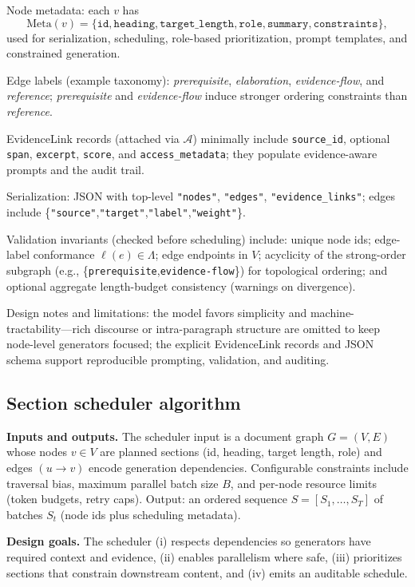 \documentclass{article}%
\begin{document}
Node metadata: each $v$ has
\[
\mathrm{Meta}(v)=\{\texttt{id},\texttt{heading},\texttt{target\_length},\texttt{role},\texttt{summary},\texttt{constraints}\},
\]
used for serialization, scheduling, role-based prioritization, prompt templates, and constrained generation.

Edge labels (example taxonomy): \emph{prerequisite}, \emph{elaboration}, \emph{evidence-flow}, and \emph{reference}; \emph{prerequisite} and \emph{evidence-flow} induce stronger ordering constraints than \emph{reference}.

EvidenceLink records (attached via $\mathcal{A}$) minimally include \texttt{source\_id}, optional \texttt{span}, \texttt{excerpt}, \texttt{score}, and \texttt{access\_metadata}; they populate evidence-aware prompts and the audit trail.

Serialization: JSON with top-level \texttt{"nodes"}, \texttt{"edges"}, \texttt{"evidence\_links"}; edges include \{\texttt{"source"},\texttt{"target"},\texttt{"label"},\texttt{"weight"}\}.

Validation invariants (checked before scheduling) include: unique node ids; edge-label conformance $\ell(e)\in\Lambda$; edge endpoints in $V$; acyclicity of the strong-order subgraph (e.g., \{\texttt{prerequisite},\texttt{evidence-flow}\}) for topological ordering; and optional aggregate length-budget consistency (warnings on divergence).

Design notes and limitations: the model favors simplicity and machine-tractability—rich discourse or intra-paragraph structure are omitted to keep node-level generators focused; the explicit EvidenceLink records and JSON schema support reproducible prompting, validation, and auditing.%

%
\subsection{Section scheduler algorithm}%


%
\textbf{Inputs and outputs.}
The scheduler input is a document graph \(G=(V,E)\) whose nodes \(v\in V\) are planned sections (id, heading, target length, role) and edges \((u\rightarrow v)\) encode generation dependencies.
Configurable constraints include traversal bias, maximum parallel batch size \(B\), and per-node resource limits (token budgets, retry caps).
Output: an ordered sequence \(S=[S_1,\dots,S_T]\) of batches \(S_t\) (node ids plus scheduling metadata).

\textbf{Design goals.}
The scheduler (i) respects dependencies so generators have required context and evidence, (ii) enables parallelism where safe, (iii) prioritizes sections that constrain downstream content, and (iv) emits an auditable schedule.
\end{document}
